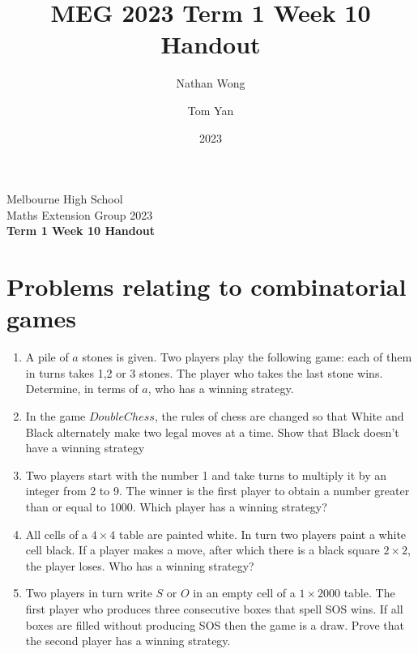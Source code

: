 \documentclass[a4paper,10pt]{article}
\title{MEG 2023 Term 1 Week 10 Handout}
\author{Nathan Wong\and Tom Yan}
\date{2023}
\newcommand{\thetitle}{Term 1 Week 10 Handout}
\begin{document}
\noindent Melbourne High School\\
Maths Extension Group 2023\\
\textbf{\thetitle}\\
\section{Problems relating to combinatorial games}
\begin{enumerate}
\item A pile of $a$ stones is given. Two players play the following game: each of them in turns takes 1,2 or 3 stones. The player who takes the last stone wins. Determine, in terms of $a$, who has a winning strategy. 
\item  In the game $Double Chess$, the rules of chess are changed so that White and Black alternately make two legal moves at a time. Show that Black doesn’t have a winning strategy 
\item Two players start with the number 1 and take turns to multiply it by an integer from 2
to 9. The winner is the first player to obtain a number greater than or equal to 1000. Which player has a winning strategy? 
\item All cells of a $4 \times 4$ table are painted white. In turn two players paint a white cell black. If a player makes a move, after which there is a black square $2 \times 2$, the player loses. Who has a winning strategy?
\item Two players in turn write $S$ or $O$ in an empty cell of a $1 \times 2000$ table. The first player who produces three consecutive boxes that spell SOS wins. If all boxes are filled without producing SOS then the game is a draw. Prove that the second player has a winning strategy.
\end{enumerate}
\twocolumn

\end{document}

